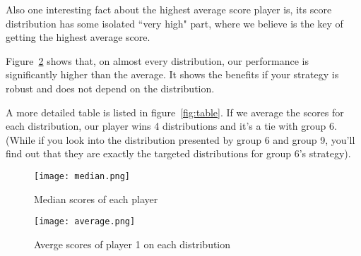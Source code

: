 Also one interesting fact about the highest average score player is, its score distribution has some isolated
``very high" part, where we believe is the key of getting the highest average score.

Figure~\ref{fig:average} shows that, on almost every distribution, our performance is significantly higher than
the average. It shows the benefits if your strategy is robust and does not depend on the distribution.

A more detailed table is listed in figure~\ref{fig:table}. If we average the scores for each distribution, our
player wins 4 distributions and it's a tie with group 6. (While if you look into the distribution presented by
group 6 and group 9, you'll find out that they are exactly the targeted distributions for group 6's strategy).

\begin{figure}[t]
\begin{center}
\texttt{[image: median.png]}
\end{center}
\caption{Median scores of each player}\label{fig:median}
\end{figure}


\begin{figure}[ht]
\begin{center}
\texttt{[image: average.png]}
\end{center}
\caption{Averge scores of player 1 on each distribution}\label{fig:average}
\end{figure}

